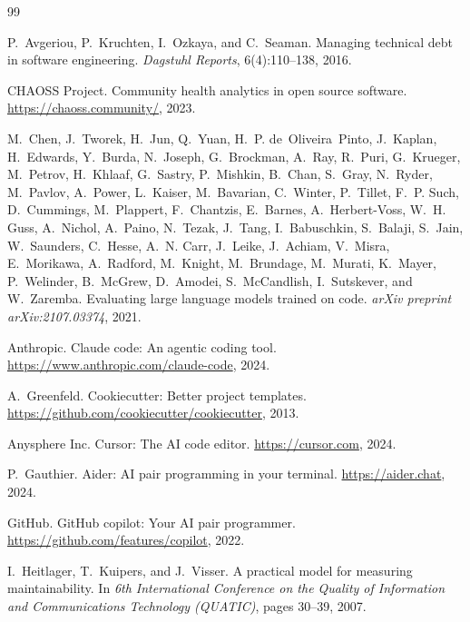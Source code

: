 \documentclass[11pt,twocolumn]{article}
\begin{document}
\begin{thebibliography}{99}

P.~Avgeriou, P.~Kruchten, I.~Ozkaya, and C.~Seaman.
\newblock Managing technical debt in software engineering.
\newblock \emph{Dagstuhl Reports}, 6(4):110--138, 2016.

{CHAOSS Project}.
\newblock Community health analytics in open source software.
\newblock \url{https://chaoss.community/}, 2023.

M.~Chen, J.~Tworek, H.~Jun, Q.~Yuan, H.~P. de~Oliveira~Pinto, J.~Kaplan,
  H.~Edwards, Y.~Burda, N.~Joseph, G.~Brockman, A.~Ray, R.~Puri, G.~Krueger,
  M.~Petrov, H.~Khlaaf, G.~Sastry, P.~Mishkin, B.~Chan, S.~Gray,
  N.~Ryder, M.~Pavlov, A.~Power, L.~Kaiser, M.~Bavarian, C.~Winter,
  P.~Tillet, F.~P. Such, D.~Cummings, M.~Plappert, F.~Chantzis,
  E.~Barnes, A.~Herbert-Voss, W.~H. Guss, A.~Nichol, A.~Paino, N.~Tezak,
  J.~Tang, I.~Babuschkin, S.~Balaji, S.~Jain, W.~Saunders, C.~Hesse,
  A.~N. Carr, J.~Leike, J.~Achiam, V.~Misra, E.~Morikawa, A.~Radford,
  M.~Knight, M.~Brundage, M.~Murati, K.~Mayer, P.~Welinder, B.~McGrew,
  D.~Amodei, S.~McCandlish, I.~Sutskever, and W.~Zaremba.
\newblock Evaluating large language models trained on code.
\newblock \emph{arXiv preprint arXiv:2107.03374}, 2021.

{Anthropic}.
\newblock Claude code: An agentic coding tool.
\newblock \url{https://www.anthropic.com/claude-code}, 2024.

A.~Greenfeld.
\newblock Cookiecutter: Better project templates.
\newblock \url{https://github.com/cookiecutter/cookiecutter}, 2013.

{Anysphere Inc.}
\newblock Cursor: The AI code editor.
\newblock \url{https://cursor.com}, 2024.

P.~Gauthier.
\newblock Aider: AI pair programming in your terminal.
\newblock \url{https://aider.chat}, 2024.

{GitHub}.
\newblock GitHub copilot: Your AI pair programmer.
\newblock \url{https://github.com/features/copilot}, 2022.

I.~Heitlager, T.~Kuipers, and J.~Visser.
\newblock A practical model for measuring maintainability.
\newblock In \emph{6th International Conference on the Quality of Information
  and Communications Technology (QUATIC)}, pages 30--39, 2007.


\end{thebibliography}
\end{document}
